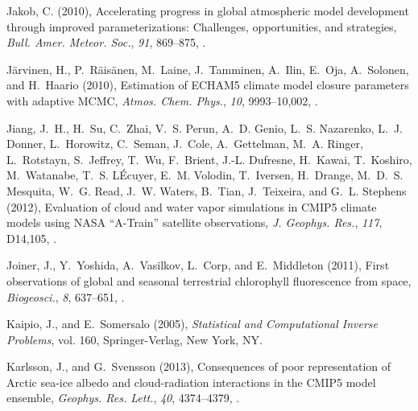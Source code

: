 \documentclass[draft]{agujournal}
\begin{document}
\begin{thebibliography}{196}
Jakob, C. (2010), Accelerating progress in global atmospheric model development
  through improved parameterizations: Challenges, opportunities, and
  strategies, \textit{Bull. Amer. Meteor. Soc.}, \textit{91}, 869--875,
  .

J{\"a}rvinen, H., P.~R{\"a}is{\"a}nen, M.~Laine, J.~Tamminen, A.~Ilin, E.~Oja,
  A.~Solonen, and H.~Haario (2010), Estimation of {ECHAM5} climate model
  closure parameters with adaptive {MCMC}, \textit{Atmos. Chem. Phys.},
  \textit{10}, 9993--10,002, .

Jiang, J.~H., H.~Su, C.~Zhai, V.~S. Perun, A.~D. Genio, L.~S. Nazarenko, L.~J.
  Donner, L.~Horowitz, C.~Seman, J.~Cole, A.~Gettelman, M.~A. Ringer,
  L.~Rotstayn, S.~Jeffrey, T.~Wu, F.~Brient, J.-L. Dufresne, H.~Kawai,
  T.~Koshiro, M.~Watanabe, T.~S. L{\'E}cuyer, E.~M. Volodin, T.~Iversen,
  H.~Drange, M.~D.~S. Mesquita, W.~G. Read, J.~W. Waters, B.~Tian, J.~Teixeira,
  and G.~L. Stephens (2012), Evaluation of cloud and water vapor simulations in
  {CMIP5} climate models using {NASA} {``A-Train''} satellite observations,
  \textit{J. Geophys. Res.}, \textit{117}, D14,105, .

Joiner, J., Y.~Yoshida, A.~Vasilkov, L.~Corp, and E.~Middleton (2011), First
  observations of global and seasonal terrestrial chlorophyll fluorescence from
  space, \textit{Biogeosci.}, \textit{8}, 637--651,
  .

Kaipio, J., and E.~Somersalo (2005), \textit{Statistical and Computational
  Inverse Problems}, vol. 160, Springer-Verlag, New York, NY.

Karlsson, J., and G.~Svensson (2013), Consequences of poor representation of
  {A}rctic sea-ice albedo and cloud-radiation interactions in the {CMIP5} model
  ensemble, \textit{Geophys. Res. Lett.}, \textit{40}, 4374--4379,
  .


\end{thebibliography}
\end{document}
